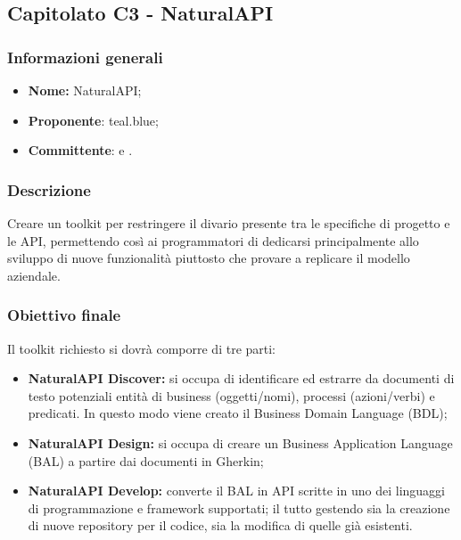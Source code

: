 \subsection{Capitolato C3 - NaturalAPI}

\subsubsection{Informazioni generali}
	\begin{itemize}
		\item \textbf{Nome:} NaturalAPI; 
		\item \textbf{Proponente}: teal.blue;
		\item \textbf{Committente}: \TV{} e \RC{}. 
	\end{itemize}

\subsubsection{Descrizione}
Creare un toolkit per restringere il divario presente tra le specifiche di progetto e le API, permettendo così ai programmatori di dedicarsi principalmente allo sviluppo di nuove funzionalità piuttosto che provare a replicare il modello aziendale. 

\subsubsection{Obiettivo finale}
Il toolkit richiesto si dovrà comporre di tre parti: 
\begin{itemize}
	\item \textbf{NaturalAPI Discover:} si occupa di identificare ed estrarre da documenti di testo potenziali entità di business (oggetti/nomi), processi (azioni/verbi) e predicati. In questo modo viene creato il Business Domain Language (BDL);  
	\item \textbf{NaturalAPI Design:} si occupa di creare un Business Application Language (BAL) a partire dai documenti in Gherkin; 
	\item \textbf{NaturalAPI Develop:} converte il BAL in API scritte in uno dei linguaggi di programmazione e framework supportati; il tutto gestendo sia la creazione di nuove repository per il codice, sia la modifica di quelle già esistenti. 
\end{itemize}

